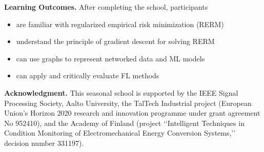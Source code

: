 \documentclass[12pt,epsf]{article}
\begin{document}
\begin{framed}
\vspace*{2mm}
{\bf Learning Outcomes.} After completing the school, participants
\begin{itemize} 
\item are familiar with regularized empirical risk minimization (RERM) \\[-9mm]
\item understand the principle of gradient descent for solving RERM \\[-9mm]
\item can use graphs to represent networked data and ML models \\[-9mm]
\item can apply and critically evaluate FL methods
\end{itemize}




{\bf Acknowledgment.} This seasonal school is supported by the IEEE Signal Processing Society, Aalto University, the TalTech Industrial project (European Union’s Horizon 2020 research and innovation programme under grant agreement No 952410), and the Academy of Finland (project ‘‘Intelligent Techniques in Condition Monitoring of Electromechanical Energy Conversion Systems,’’ decision number 331197). 


\end{framed}
\end{document}
